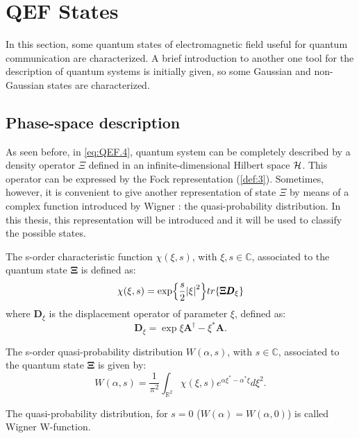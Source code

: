 \section{QEF States}
    In this section, some quantum states of electromagnetic field useful for quantum 
    communication are characterized. A brief introduction to another one tool for the 
    description of quantum systems is initially given, so some Gaussian and 
    non-Gaussian states are characterized.

    \subsection{Phase-space description}
        As seen before, in \ref{eq:QEF.4}, quantum system can be completely
        described by a density operator $\Xi$ defined in an infinite-dimensional Hilbert space
        $\mathcal{H}$. This operator can be expressed by the Fock representation (\ref{def:3}).
        Sometimes, however, it is convenient to give another representation of state $\Xi$ by
        means of a complex function introduced by Wigner \cite{Wigner}: the quasi-probability 
        distribution. In this thesis, this representation will be introduced and it will be used to
        classify the possible states.

        \begin{definition}
            The s-order characteristic function $\mathcal{\chi}(\xi,s)$, with $\xi,s\in\mathbb{C}$,
            associated to the quantum state $\pmb{\Xi}$ is defined as:
            \begin{equation}
                \mathcal{\chi}(\xi,s)=\exp{\frac{s}{2}\absolutevalue{\xi}^2}
                tr\{\pmb{\Xi}\pmb{D}_\xi\}
            \end{equation}
            where $\pmb{D}_\xi$ is  the displacement operator of parameter $\xi$, defined as:
            \begin{equation}
                \pmb{D}_\xi=\exp{\xi\pmb{A}^\dagger-\xi^*\pmb{A}}.
            \end{equation}
            \label{def:QEFStates.1}
        \end{definition}
        \begin{definition}
            The s-order quasi-probability distribution $W(\alpha,s)$, with $s\in\mathbb{C}$,
            associated to the quantum state $\mathbf{\Xi}$ is given by:
            \begin{equation}
                W(\alpha,s)=\frac{1}{\pi^2}\int_{\mathbb{R}^2} 
                \mathcal{\chi}(\xi,s)e^{\alpha\xi^*-\alpha^*\xi}d\xi^2.
            \end{equation}
            \label{def:QEFStates.2}
        \end{definition}
        The quasi-probability distribution, for $s=0$ ($W(\alpha)=W(\alpha,0)$) is called 
        Wigner W-function.
        
